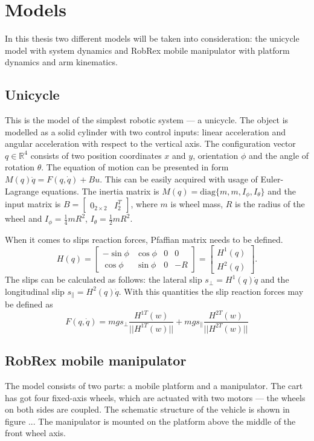 \chapter{Models}
\label{ch:model}
In this thesis two different models will be taken into consideration: the unicycle model with system dynamics and RobRex mobile manipulator with platform dynamics and arm kinematics.
\section{Unicycle}
This is the model of the simplest robotic system --- a unicycle. The object is modelled as a solid cylinder with two control inputs: linear acceleration and angular acceleration with respect to the vertical axis. The configuration vector $q\in \mathbb{R}^4$ consists of two position coordinates $x$ and $y$, orientation $\phi$ and the angle of rotation $\theta$. The equation of motion can be presented in form $M(q)\ddot q =F(q, \dot q)+Bu$. This can be easily acquired with usage of Euler-Lagrange equations. The inertia matrix is $M(q)=\mathrm{diag}\{m, m, I_\phi, I_\theta\}$ and the input matrix is $B=\begin{bmatrix}
0_{2 \times 2} & I_2^T
\end{bmatrix}$, where $m$ is wheel mass, $R$ is the radius of the wheel and $I_\phi=\frac{1}{4}mR^2$, $I_\theta=\frac{1}{2}mR^2$.

When it comes to slips reaction forces, Pfaffian matrix needs to be defined.
\begin{equation}
H(q)=\begin{bmatrix}
-\sin\phi & \cos\phi & 0 & 0\\
\cos\phi & \sin\phi & 0 & -R
\end{bmatrix}=\begin{bmatrix}
H^1(q)\\
H^2(q)
\end{bmatrix}.
\end{equation}
The slips can be calculated as follows: the lateral slip $s_\perp=H^1(q)\dot q$ and the longitudinal slip $s_\parallel=H^2(q)\dot q$. With this quantities the slip reaction forces may be defined as 
\begin{equation}
F(q, \dot q)=mgs_\perp\frac{H^{1T}(w)}{||H^{1T}(w)||} + mgs_\parallel\frac{H^{2T}(w)}{||H^{2T}(w)||}
\end{equation}
\section{RobRex mobile manipulator}
The model consists of two parts: a mobile platform and a manipulator. The cart has got four fixed-axis wheels, which are actuated with two motors --- the wheels on both sides are coupled. The schematic structure of the vehicle is shown in figure ... %
The manipulator is mounted on the platform above the middle of the front wheel axis.

